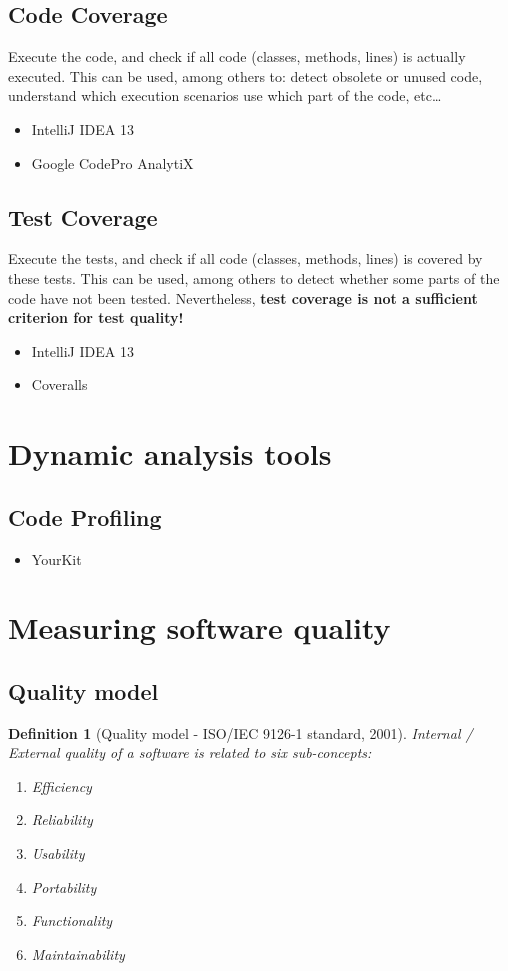 \documentclass[a4paper,11pt]{report}
\newtheorem{definition}{Definition}
\begin{document}
\subsection{Code Coverage}
Execute the code, and check if all code (classes, methods, lines) is actually
executed. This can be used, among others to: detect obsolete or unused code,
understand which execution scenarios use which part of the code, etc\dots

\begin{itemize}
\item IntelliJ IDEA 13
\item Google CodePro AnalytiX
\end{itemize}

\subsection{Test Coverage}
Execute the tests, and check if all code (classes, methods, lines) is covered by
these tests. This can be used, among others to detect whether some parts of the
code have not been tested. Nevertheless, \textbf{test coverage is not a
sufficient criterion for test quality!}

\begin{itemize}
\item IntelliJ IDEA 13
\item Coveralls
\end{itemize}

\section{Dynamic analysis tools}
\subsection{Code Profiling}
\begin{itemize}
\item YourKit
\end{itemize}

\section{Measuring software quality}
\subsection{Quality model}
\begin{definition}[Quality model - ISO/IEC 9126-1 standard, 2001]
Internal / External quality of a software is related to six sub-concepts:
\begin{enumerate}
\item Efficiency
\item Reliability
\item Usability
\item Portability
\item Functionality
\item Maintainability
\end{enumerate}
\end{definition}
\end{document}
